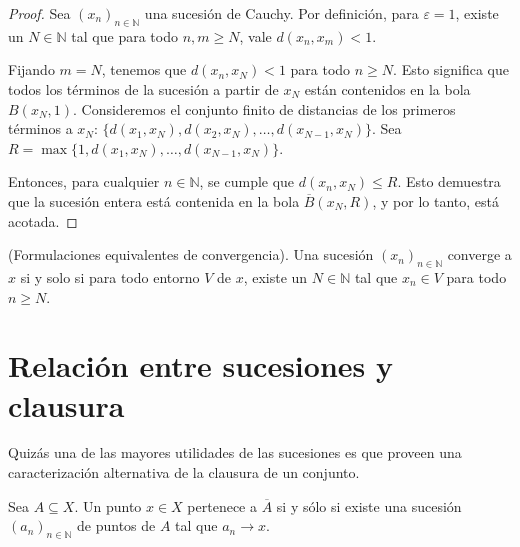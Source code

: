 \begin{proof}
	Sea $(x_n)_{n \in \mathbb{N}}$ una sucesión de Cauchy. Por definición, para $\varepsilon = 1$, existe un $N \in \mathbb{N}$ tal que para todo $n, m \geq N$, vale $d(x_n, x_m) < 1$.

	Fijando $m=N$, tenemos que $d(x_n, x_N) < 1$ para todo $n \ge N$. Esto significa que todos los términos de la sucesión a partir de $x_N$ están contenidos en la bola $B(x_N, 1)$. Consideremos el conjunto finito de distancias de los primeros términos a $x_N$: $\{d(x_1, x_N), d(x_2, x_N), \dots, d(x_{N-1}, x_N)\}$. Sea $R = \max\{1, d(x_1, x_N), \dots, d(x_{N-1}, x_N)\}$.

	Entonces, para cualquier $n \in \mathbb{N}$, se cumple que $d(x_n, x_N) \leq R$. Esto demuestra que la sucesión entera está contenida en la bola $\overline{B}(x_N, R)$, y por lo tanto, está acotada.
\end{proof}

\begin{remark}
	(Formulaciones equivalentes de convergencia). Una sucesión $(x_n)_{n \in \mathbb{N}}$ converge a $x$ si y solo si para todo entorno $V$ de $x$, existe un $N \in \mathbb{N}$ tal que $x_n \in V$ para todo $n \geq N$.
\end{remark}

\section{Relación entre sucesiones y clausura}

Quizás una de las mayores utilidades de las sucesiones es que proveen una caracterización alternativa de la clausura de un conjunto.

\begin{proposition}
	Sea $A \subseteq X$. Un punto $x \in X$ pertenece a $\overline{A}$ si y sólo si existe una sucesión $(a_{n})_{n \in \mathbb{N}}$ de puntos de $A$ tal que $a_{n} \longrightarrow x$.
\end{proposition}

